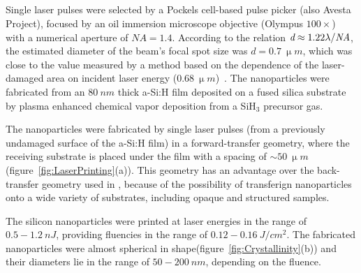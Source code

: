 
    \subsection{}
        Single laser pulses were selected by a Pockels cell-based pulse picker (also Avesta Project),
        focused by an oil immersion microscope objective (Olympus $100\times$)
        with a numerical aperture of $\mathit{NA}=1.4$. According to the relation $\emph{d}\approx 1.22\lambda/\mathit{NA}$, the estimated
        diameter of the beam's focal spot size was $d=0.7~\si{\upmu m}$, which was close to the value measured by a method based on
        the dependence of the laser-damaged area on incident laser energy ($0.68~\si{\upmu m}$)~\cite{liu1982simple}.
        The nanoparticles were fabricated from an $80~\si{nm}$ thick a-Si:H film deposited on a fused silica substrate by
        plasma enhanced chemical vapor deposition from a SiH$_{3}$ precursor gas.

            The nanoparticles were fabricated by single laser pulses (from a previously undamaged surface of the a-Si:H film) in a
        forward-transfer geometry, where the receiving substrate is placed under the film with a spacing
        of $\sim 50~\si{\upmu m}$ (figure~\ref{fig:LaserPrinting}(a)). This geometry has an advantage over the back-transfer geometry
        used in \cite{zywietz2014laser}, because of the possibility of transferign nanoparticles onto a wide variety of substrates,
        including opaque and structured samples.

            The silicon nanoparticles were printed at laser energies in the range of $0.5-1.2~\si{nJ}$, providing fluencies in
        the range of $0.12-0.16~\si{J/cm^{2}}$. The fabricated nanoparticles were almost spherical in shape(figure~\ref{fig:Crystallinity}(b))
        and their diameters lie in the range of $50-200~\si{nm}$, depending on the fluence.

